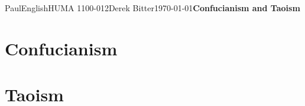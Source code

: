 \documentclass[12pt,letterpaper]{article}
\begin{document}
\begin{mla}{Paul}{English}{HUMA 1100-012}{Derek
    Bitter}{\today}{\textbf{Confucianism and Taoism}}


  
\section{Confucianism}
\section{Taoism}

\end{mla}
\end{document}
